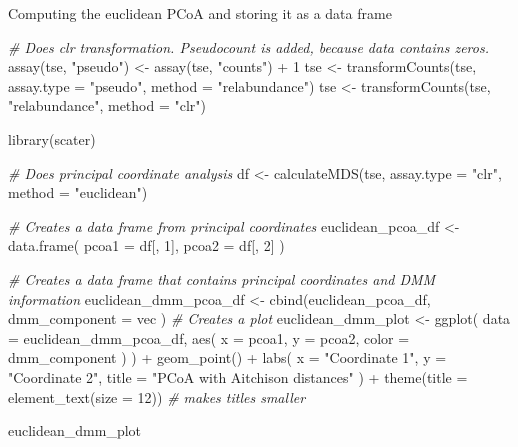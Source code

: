\documentclass[
]{book}
\newenvironment{Shaded}{\begin{snugshade}}{\end{snugshade}}
\newcommand{\AttributeTok}[1]{\textcolor[rgb]{0.77,0.63,0.00}{#1}}
\newcommand{\CommentTok}[1]{\textcolor[rgb]{0.56,0.35,0.01}{\textit{#1}}}
\newcommand{\DecValTok}[1]{\textcolor[rgb]{0.00,0.00,0.81}{#1}}
\newcommand{\FunctionTok}[1]{\textcolor[rgb]{0.00,0.00,0.00}{#1}}
\newcommand{\NormalTok}[1]{#1}
\newcommand{\OtherTok}[1]{\textcolor[rgb]{0.56,0.35,0.01}{#1}}
\newcommand{\SpecialCharTok}[1]{\textcolor[rgb]{0.00,0.00,0.00}{#1}}
\newcommand{\StringTok}[1]{\textcolor[rgb]{0.31,0.60,0.02}{#1}}
\begin{document}
Computing the euclidean PCoA and storing it as a data frame

\begin{Shaded}
\begin{Highlighting}[]
\CommentTok{\# Does clr transformation. Pseudocount is added, because data contains zeros.}
\FunctionTok{assay}\NormalTok{(tse, }\StringTok{"pseudo"}\NormalTok{) }\OtherTok{\textless{}{-}} \FunctionTok{assay}\NormalTok{(tse, }\StringTok{"counts"}\NormalTok{) }\SpecialCharTok{+} \DecValTok{1}
\NormalTok{tse }\OtherTok{\textless{}{-}} \FunctionTok{transformCounts}\NormalTok{(tse, }\AttributeTok{assay.type =} \StringTok{"pseudo"}\NormalTok{, }\AttributeTok{method =} \StringTok{"relabundance"}\NormalTok{)}
\NormalTok{tse }\OtherTok{\textless{}{-}} \FunctionTok{transformCounts}\NormalTok{(tse, }\StringTok{"relabundance"}\NormalTok{, }\AttributeTok{method =} \StringTok{"clr"}\NormalTok{)}

\FunctionTok{library}\NormalTok{(scater)}

\CommentTok{\# Does principal coordinate analysis}
\NormalTok{df }\OtherTok{\textless{}{-}} \FunctionTok{calculateMDS}\NormalTok{(tse, }\AttributeTok{assay.type =} \StringTok{"clr"}\NormalTok{, }\AttributeTok{method =} \StringTok{"euclidean"}\NormalTok{)}

\CommentTok{\# Creates a data frame from principal coordinates}
\NormalTok{euclidean\_pcoa\_df }\OtherTok{\textless{}{-}} \FunctionTok{data.frame}\NormalTok{(}
  \AttributeTok{pcoa1 =}\NormalTok{ df[, }\DecValTok{1}\NormalTok{],}
  \AttributeTok{pcoa2 =}\NormalTok{ df[, }\DecValTok{2}\NormalTok{]}
\NormalTok{)}
\end{Highlighting}
\end{Shaded}

\begin{Shaded}
\begin{Highlighting}[]
\CommentTok{\# Creates a data frame that contains principal coordinates and DMM information}
\NormalTok{euclidean\_dmm\_pcoa\_df }\OtherTok{\textless{}{-}} \FunctionTok{cbind}\NormalTok{(euclidean\_pcoa\_df,}
  \AttributeTok{dmm\_component =}\NormalTok{ vec}
\NormalTok{)}
\CommentTok{\# Creates a plot}
\NormalTok{euclidean\_dmm\_plot }\OtherTok{\textless{}{-}} \FunctionTok{ggplot}\NormalTok{(}
  \AttributeTok{data =}\NormalTok{ euclidean\_dmm\_pcoa\_df,}
  \FunctionTok{aes}\NormalTok{(}
    \AttributeTok{x =}\NormalTok{ pcoa1, }\AttributeTok{y =}\NormalTok{ pcoa2,}
    \AttributeTok{color =}\NormalTok{ dmm\_component}
\NormalTok{  )}
\NormalTok{) }\SpecialCharTok{+}
  \FunctionTok{geom\_point}\NormalTok{() }\SpecialCharTok{+}
  \FunctionTok{labs}\NormalTok{(}
    \AttributeTok{x =} \StringTok{"Coordinate 1"}\NormalTok{,}
    \AttributeTok{y =} \StringTok{"Coordinate 2"}\NormalTok{,}
    \AttributeTok{title =} \StringTok{"PCoA with Aitchison distances"}
\NormalTok{  ) }\SpecialCharTok{+}
  \FunctionTok{theme}\NormalTok{(}\AttributeTok{title =} \FunctionTok{element\_text}\NormalTok{(}\AttributeTok{size =} \DecValTok{12}\NormalTok{)) }\CommentTok{\# makes titles smaller}

\NormalTok{euclidean\_dmm\_plot}
\end{Highlighting}
\end{Shaded}
\end{document}
